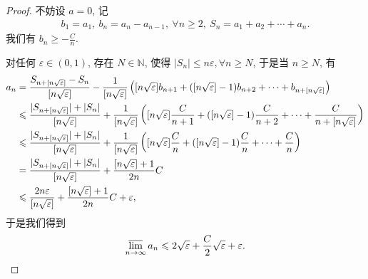 \documentclass[../../main.tex]{subfiles}%
\begin{document}
\begin{proof}

不妨设 $a = 0$, 记
\begin{align*}
b_1 = a_1,\ b_n = a_n - a_{n-1},\ \forall n \geqslant 2,\ S_n = a_1 + a_2 + \cdots + a_n.
\end{align*}
我们有 $b_n \geqslant -\frac{C}{n}$.

对任何 $\varepsilon \in (0,1)$, 存在 $N \in \mathbb{N}$, 使得 $|S_n| \leqslant n \varepsilon, \forall n \geqslant N$, 于是当 $n \geqslant N$, 有
\begin{align}
a_n &= \frac{S_{n + [n\sqrt{\varepsilon}]} - S_n}{[n\sqrt{\varepsilon}]} - \frac{1}{[n\sqrt{\varepsilon}]} \left( [n\sqrt{\varepsilon}] b_{n+1} + ([n\sqrt{\varepsilon}] - 1) b_{n+2} + \cdots + b_{n + [n\sqrt{\varepsilon}]} \right) \notag \\
&\leqslant \frac{|S_{n + [n\sqrt{\varepsilon}]}| + |S_n|}{[n\sqrt{\varepsilon}]} + \frac{1}{[n\sqrt{\varepsilon}]} \left( [n\sqrt{\varepsilon}] \frac{C}{n + 1} + ([n\sqrt{\varepsilon}] - 1) \frac{C}{n + 2} + \cdots + \frac{C}{n + [n\sqrt{\varepsilon}]} \right) \notag \\
&\leqslant \frac{|S_{n + [n\sqrt{\varepsilon}]}| + |S_n|}{[n\sqrt{\varepsilon}]} + \frac{1}{[n\sqrt{\varepsilon}]} \left( [n\sqrt{\varepsilon}] \frac{C}{n} + ([n\sqrt{\varepsilon}] - 1) \frac{C}{n} + \cdots + \frac{C}{n} \right) \notag \\
&= \frac{|S_{n + [n\sqrt{\varepsilon}]}| + |S_n|}{[n\sqrt{\varepsilon}]} + \frac{[n\sqrt{\varepsilon}] + 1}{2n} C \notag \\
&\leqslant \frac{2n \varepsilon}{[n\sqrt{\varepsilon}]} + \frac{[n\sqrt{\varepsilon}] + 1}{2n} C + \varepsilon, \label{eq:9.130}
\end{align}
于是我们得到
\begin{align*}
\varlimsup_{n \to \infty} a_n \leqslant 2\sqrt{\varepsilon} + \frac{C}{2}\sqrt{\varepsilon} + \varepsilon.
\end{align*}


\end{proof}
\end{document}
